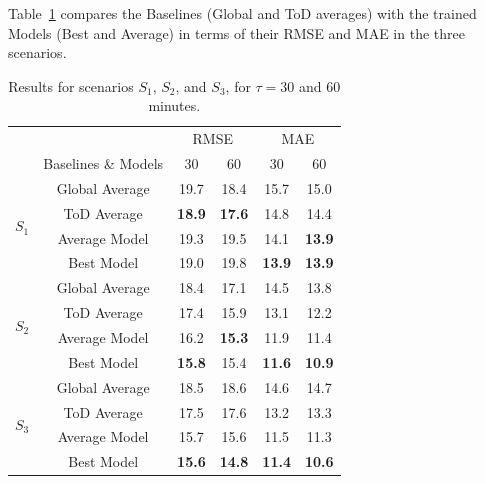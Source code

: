 \documentclass{ecai}
\begin{document}

Table~\ref{tab:all_results} compares the Baselines (Global and ToD averages) with the trained Models (Best and Average) in terms of their RMSE and MAE in the three scenarios.
\begin{table}
\caption{Results for scenarios $S_{1}$, $S_{2}$, and $S_{3}$, for $\tau = 30$ and 60 minutes.}
\begin{center}
\label{tab:all_results}
\begin{tabular}{|c|c|c|c|c|c|}

   	\cline{3-6}
	\multicolumn{2}{c}{} & \multicolumn{2}{|c|}{RMSE} & \multicolumn{2}{c|}{MAE}\\
	\cline{2-6}
	\multicolumn{1}{c|}{} & Baselines \& Models & 30 & 60 & 30 & 60\\
	\hline
	\multirow{4}{*}{$S_{1}$} & Global Average & 19.7 & 18.4 & 15.7 & 15.0\\
					   & ToD Average & \textbf{18.9} & \textbf{17.6} & 14.8 & 14.4\\
					   \cline{2-6}
					   & Average Model & 19.3 & 19.5 & 14.1 & \textbf{13.9}\\
					   & Best Model & 19.0 & 19.8 & \textbf{13.9} & \textbf{13.9}\\
	\hline
	\multirow{4}{*}{$S_{2}$} & Global Average & 18.4 & 17.1 & 14.5 & 13.8\\
					   & ToD Average & 17.4 & 15.9 & 13.1 & 12.2\\
					   \cline{2-6}
					   & Average Model & 16.2 & \textbf{15.3} & 11.9 & 11.4\\
					   & Best Model & \textbf{15.8} & 15.4 & \textbf{11.6} & \textbf{10.9}\\
	\hline
	\multirow{4}{*}{$S_{3}$} & Global Average & 18.5 & 18.6 & 14.6 & 14.7\\
					   & ToD Average & 17.5 & 17.6 & 13.2 & 13.3\\
					   \cline{2-6}
					   & Average Model & 15.7 & 15.6 & 11.5 & 11.3\\
					   & Best Model & \textbf{15.6} & \textbf{14.8} & \textbf{11.4} & \textbf{10.6}\\
	\hline
	

\end{tabular}
\end{center}
\end{table}
\end{document}
